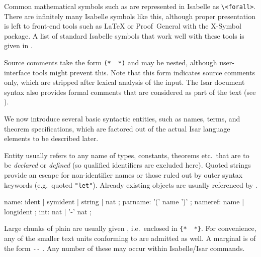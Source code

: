 \begin{isabellebody}
\begin{isamarkuptext}
  Common mathematical symbols such as \isa{{\isasymforall}} are represented in
  Isabelle as \verb|\<forall>|.  There are infinitely many Isabelle
  symbols like this, although proper presentation is left to front-end
  tools such as {\LaTeX} or Proof~General with the X-Symbol package.
  A list of standard Isabelle symbols that work well with these tools
  is given in \cite[appendix~A]{isabelle-sys}.
  
  Source comments take the form \verb|(*|~\isa{{\isachardoublequote}{\isasymdots}{\isachardoublequote}}~\verb|*)| and may be nested, although user-interface
  tools might prevent this.  Note that this form indicates source
  comments only, which are stripped after lexical analysis of the
  input.  The Isar document syntax also provides formal comments that
  are considered as part of the text (see ).%
\end{isamarkuptext}%
\isamarkuptrue%
%
\isamarkuptrue%
%
\begin{isamarkuptext}%
We now introduce several basic syntactic entities, such as names,
  terms, and theorem specifications, which are factored out of the
  actual Isar language elements to be described later.%
\end{isamarkuptext}%
\isamarkuptrue%
%
\isamarkuptrue%
%
\begin{isamarkuptext}%
Entity  usually refers to any name of types,
  constants, theorems etc.\ that are to be \emph{declared} or
  \emph{defined} (so qualified identifiers are excluded here).  Quoted
  strings provide an escape for non-identifier names or those ruled
  out by outer syntax keywords (e.g.\ quoted \verb|"let"|).
  Already existing objects are usually referenced by
  .

  \begin{rail}
    name: ident | symident | string | nat
    ;
    parname: '(' name ')'
    ;
    nameref: name | longident
    ;
    int: nat | '-' nat
    ;
  \end{rail}%
\end{isamarkuptext}%
\isamarkuptrue%
%
\isamarkuptrue%
%
\begin{isamarkuptext}%
Large chunks of plain  are usually given
  , i.e.\ enclosed in \verb|{|\verb|*|~\isa{{\isachardoublequote}{\isasymdots}{\isachardoublequote}}~\verb|*|\verb|}|.  For convenience,
  any of the smaller text units conforming to  are
  admitted as well.  A marginal  is of the form
  \verb|--| .  Any number of these may occur
  within Isabelle/Isar commands.


\end{isamarkuptext}
\end{isabellebody}
